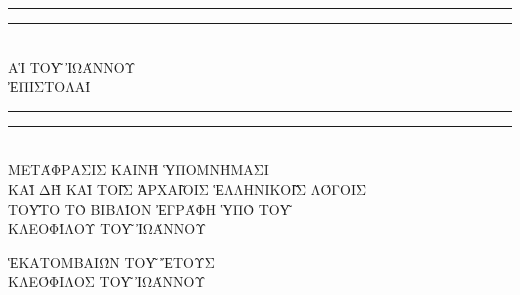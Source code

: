 \begin{doubletitle}
    \textheight
    \centering
    \vspace*{\baselineskip}
    \rule{\textwidth}{1.6pt}\vspace*{-\baselineskip}\vspace*{2pt}
    \rule{\textwidth}{0.4pt}\\[\baselineskip]
    {\uppercase{\LARGE Αἱ τοῦ Ἰωάννου \\[0.3\baselineskip]  ἐπιστολαί }}\\[0.2\baselineskip]
    \rule{\textwidth}{0.4pt}\vspace*{-\baselineskip}\vspace{3.2pt}
    \rule{\textwidth}{1.6pt}\\[\baselineskip]
    \scshape
    \uppercase{Μετάφρασις καινὴ ὑπομνήμασι \\
    καὶ δὴ καὶ τοῖς ἀρχαῖοις Ἑλληνικοῖς λόγοις} \\ 
    \vspace*{2\baselineskip}  
    \uppercase{Τοῦτο τὸ βιβλίον ἐγράφη ὑπὸ τοῦ \\[\baselineskip]
    {\Large Κλεοφίλου τοῦ Ἰωάννου}}\par
    \vfill
    {\scshape \uppercase{Ἑκατομβαιών τοῦ} } \uppercase{ἔτους}  \\
    {\large \uppercase{Κλεόφιλος τοῦ Ἰωάννου}}\par
\end{doubletitle}